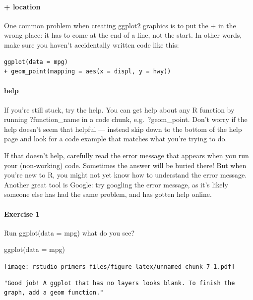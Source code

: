 \documentclass[
]{article}
\newenvironment{Shaded}{\begin{snugshade}}{\end{snugshade}}
\newcommand{\AttributeTok}[1]{\textcolor[rgb]{0.77,0.63,0.00}{#1}}
\newcommand{\FunctionTok}[1]{\textcolor[rgb]{0.00,0.00,0.00}{#1}}
\newcommand{\NormalTok}[1]{#1}
\begin{document}
\hypertarget{location}{%
\paragraph{+ location}\label{location}}

One common problem when creating ggplot2 graphics is to put the + in the
wrong place: it has to come at the end of a line, not the start. In
other words, make sure you haven't accidentally written code like this:

\begin{verbatim}
ggplot(data = mpg) 
+ geom_point(mapping = aes(x = displ, y = hwy))
\end{verbatim}

\hypertarget{help}{%
\paragraph{help}\label{help}}

If you're still stuck, try the help. You can get help about any R
function by running ?function\_name in a code chunk, e.g.~?geom\_point.
Don't worry if the help doesn't seem that helpful --- instead skip down
to the bottom of the help page and look for a code example that matches
what you're trying to do.

If that doesn't help, carefully read the error message that appears when
you run your (non-working) code. Sometimes the answer will be buried
there! But when you're new to R, you might not yet know how to
understand the error message. Another great tool is Google: try googling
the error message, as it's likely someone else has had the same problem,
and has gotten help online.

\hypertarget{exercise-1}{%
\paragraph{Exercise 1}\label{exercise-1}}

Run ggplot(data = mpg) what do you see?

\begin{Shaded}
\begin{Highlighting}[]
\FunctionTok{ggplot}\NormalTok{(}\AttributeTok{data =}\NormalTok{ mpg)}
\end{Highlighting}
\end{Shaded}

\texttt{[image: rstudio\_primers\_files/figure-latex/unnamed-chunk-7-1.pdf]}

\begin{verbatim}
"Good job! A ggplot that has no layers looks blank. To finish the graph, add a geom function."
\end{verbatim}
\end{document}
